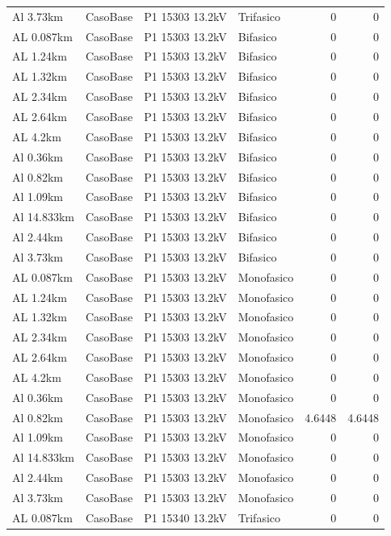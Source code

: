\documentclass[11pt,a4paper]{article}
\begin{document}
\begin{longtable}{llllrr}
Al 3.73km & CasoBase & P1 15303 13.2kV & Trifasico & 0 & 0 \\
AL 0.087km & CasoBase & P1 15303 13.2kV & Bifasico & 0 & 0 \\
AL 1.24km & CasoBase & P1 15303 13.2kV & Bifasico & 0 & 0 \\
AL 1.32km & CasoBase & P1 15303 13.2kV & Bifasico & 0 & 0 \\
AL 2.34km & CasoBase & P1 15303 13.2kV & Bifasico & 0 & 0 \\
AL 2.64km & CasoBase & P1 15303 13.2kV & Bifasico & 0 & 0 \\
AL 4.2km & CasoBase & P1 15303 13.2kV & Bifasico & 0 & 0 \\
Al 0.36km & CasoBase & P1 15303 13.2kV & Bifasico & 0 & 0 \\
Al 0.82km & CasoBase & P1 15303 13.2kV & Bifasico & 0 & 0 \\
Al 1.09km & CasoBase & P1 15303 13.2kV & Bifasico & 0 & 0 \\
Al 14.833km & CasoBase & P1 15303 13.2kV & Bifasico & 0 & 0 \\
Al 2.44km & CasoBase & P1 15303 13.2kV & Bifasico & 0 & 0 \\
Al 3.73km & CasoBase & P1 15303 13.2kV & Bifasico & 0 & 0 \\
AL 0.087km & CasoBase & P1 15303 13.2kV & Monofasico & 0 & 0 \\
AL 1.24km & CasoBase & P1 15303 13.2kV & Monofasico & 0 & 0 \\
AL 1.32km & CasoBase & P1 15303 13.2kV & Monofasico & 0 & 0 \\
AL 2.34km & CasoBase & P1 15303 13.2kV & Monofasico & 0 & 0 \\
AL 2.64km & CasoBase & P1 15303 13.2kV & Monofasico & 0 & 0 \\
AL 4.2km & CasoBase & P1 15303 13.2kV & Monofasico & 0 & 0 \\
Al 0.36km & CasoBase & P1 15303 13.2kV & Monofasico & 0 & 0 \\
Al 0.82km & CasoBase & P1 15303 13.2kV & Monofasico & 4.6448 & 4.6448 \\
Al 1.09km & CasoBase & P1 15303 13.2kV & Monofasico & 0 & 0 \\
Al 14.833km & CasoBase & P1 15303 13.2kV & Monofasico & 0 & 0 \\
Al 2.44km & CasoBase & P1 15303 13.2kV & Monofasico & 0 & 0 \\
Al 3.73km & CasoBase & P1 15303 13.2kV & Monofasico & 0 & 0 \\
AL 0.087km & CasoBase & P1 15340 13.2kV & Trifasico & 0 & 0 \\

\end{longtable}
\end{document}
